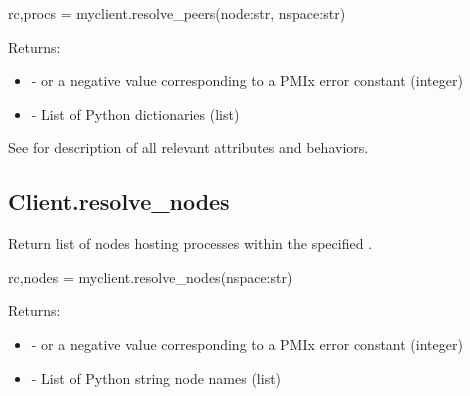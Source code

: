\pyspecificstart
\begin{codepar}
rc,procs = myclient.resolve_peers(node:str, nspace:str)
\end{codepar}
\pyspecificend

\begin{arglist}
\end{arglist}

Returns:

\begin{itemize}
    \item {} -  or a negative value corresponding to a PMIx error constant (integer)
    \item {} - List of Python  dictionaries (list)
\end{itemize}

See  for description of all relevant attributes and behaviors.


\subsection{Client.resolve_nodes}

\summary

Return list of nodes hosting processes within the specified .

\format

\pyspecificstart
\begin{codepar}
rc,nodes = myclient.resolve_nodes(nspace:str)
\end{codepar}
\pyspecificend

\begin{arglist}
\end{arglist}

Returns:

\begin{itemize}
    \item {} -  or a negative value corresponding to a PMIx error constant (integer)
    \item {} - List of Python string node names (list)
\end{itemize}

